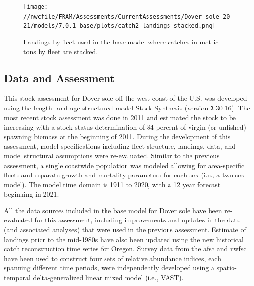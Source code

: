 \documentclass[11pt,
  english,
  a4paper,
]{article}
\begin{document}
\begin{figure}
\centering
\texttt{[image: //nwcfile/FRAM/Assessments/CurrentAssessments/Dover\_sole\_2021/models/7.0.1\_base/plots/catch2 landings stacked.png]}
\caption{Landings by fleet used in the base model where catches in metric tons by fleet are stacked.\label{fig:es-catch}}
\end{figure}

\tagmcend\tagstructend

\clearpage


\hypertarget{data-and-assessment}{%
\subsection*{Data and Assessment}\label{data-and-assessment}}

\leavevmode\tagmcend\tagstructend


This stock assessment for Dover sole off the west coast of the U.S. was developed using the length- and age-structured model Stock Synthesis (version 3.30.16). The most recent stock assessment was done in 2011 and estimated the stock to be increasing with a stock status determination of 84 percent of virgin (or unfished) spawning biomass at the beginning of 2011. During the development of this assessment, model specifications including fleet structure, landings, data, and model structural assumptions were re-evaluated. Similar to the previous assessment, a single coastwide population was modeled allowing for area-specific fleets and separate growth and mortality parameters for each sex (i.e., a two-sex model). The model time domain is 1911 to 2020, with a 12 year forecast beginning in 2021.

\leavevmode\tagmcend\tagstructend\par


All the data sources included in the base model for Dover sole have been re-evaluated for this assessment, including improvements and updates in the data (and associated analyses) that were used in the previous assessment. Estimate of landings prior to the mid-1980s have also been updated using the new historical catch reconstruction time series for Oregon. Survey data from the \gls{afsc} and \gls{nwfsc} have been used to construct four sets of relative abundance indices, each spanning different time periods, were independently developed using a spatio-temporal delta-generalized linear mixed model (i.e., VAST).
\end{document}
